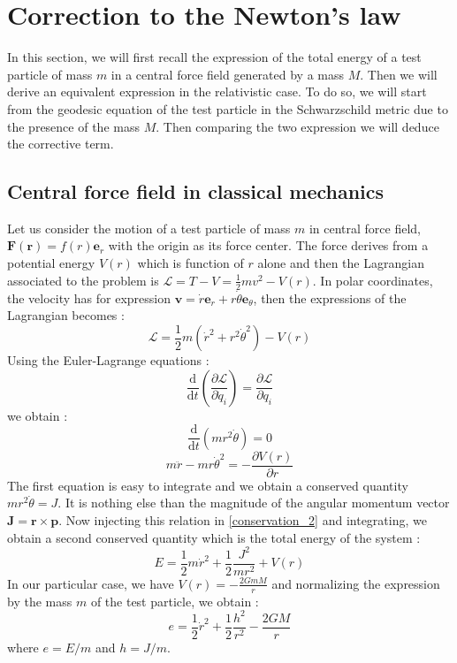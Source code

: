 \section{Correction to the Newton's law}

In this section, we will first recall the expression of the total energy of a test particle of mass $m$ in a central force field
generated by a mass $M$. Then we will derive an equivalent expression in the relativistic case. To do so, we will start
from the geodesic equation of the test particle in the Schwarzschild metric due to the presence of the mass $M$. Then comparing
the two expression we will deduce the corrective term.

\subsection{Central force field in classical mechanics}

Let us consider the motion of a test particle of mass $m$ in central force field, $\textbf{F}(\textbf{r}) = f(r)\textbf{e}_r$
with the origin as its force center. The force derives from a potential energy $V(r)$ which is function of $r$ alone and then the Lagrangian
associated to the problem is $\mathcal{L} = T - V = \frac{1}{2}m v^2 - V(r)$. In polar coordinates, the velocity has for expression
$\mathbf{v}= \dot{r}\mathbf{e}_r + r\dot{\theta} \mathbf{e}_\theta$, then the expressions of the Lagrangian becomes :
%
\begin{equation}
 \mathcal{L} = \frac{1}{2}m\left(\dot{r}^2 + r^2 \dot{\theta}^2\right) - V(r)
\end{equation}
%
Using the Euler-Lagrange equations : 
%
\begin{equation}
 \frac{\mathrm{d}}{\mathrm{d}t}\left( \frac{\partial \mathcal{L}}{\partial \dot{q}_i} \right) = \frac{\partial \mathcal{L}}{\partial q_i}
\end{equation}
%
we obtain :
%
\begin{equation}\label{conservation_1}
  \frac{\mathrm{d}}{\mathrm{d}t}\left( mr^2\dot{\theta}\right) = 0
\end{equation}
%
\begin{equation}\label{conservation_2}
   m\ddot{r} - mr\dot{\theta}^2 = -\frac{\partial V(r)}{\partial r}
\end{equation}
%
The first equation is easy to integrate and we obtain a conserved quantity $mr^2\dot{\theta} = J$.
It is nothing else than the magnitude of the angular momentum vector $ \mathbf{J} = \mathbf{r} \times \mathbf{p}$.
Now injecting this relation in \eqref{conservation_2} and integrating, we obtain a second conserved quantity which is the total energy
of the system :
%
\begin{equation}
 E = \frac{1}{2}m\dot{r}^2 + \frac{1}{2}\frac{J^2}{mr^2} + V(r)
\end{equation}
%
In our particular case, we have $V(r) = - \frac{2GmM}{r}$ and normalizing the expression by the mass $m$ of the test particle, we obtain :
%
\begin{equation}\label{classical_relation}
  e = \frac{1}{2}\dot{r}^2 + \frac{1}{2}\frac{h^2}{r^2} -\frac{2GM}{r}
\end{equation}
%
where $e = E/m$ and $h=J/m$.

